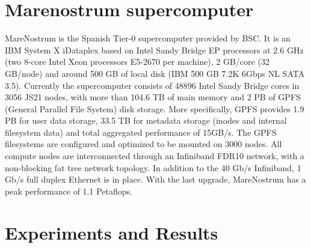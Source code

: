 \documentclass[journal]{IEEEtran}
\begin{document}
\section{Marenostrum supercomputer}
\label{sec:marenostrum}

MareNostrum is the Spanish Tier-0 supercomputer provided by BSC. It is an IBM System X iDataplex based on Intel Sandy Bridge EP processors at 2.6 GHz (two 8-core Intel Xeon processors E5-2670 per machine), 2 GB/core (32 GB/node) and around 500 GB of local disk (IBM 500 GB  7.2K 6Gbps NL SATA 3.5). Currently the supercomputer consists of 48896 Intel Sandy Bridge cores in 3056 JS21 nodes, with more than 104.6 TB of main memory and 2 PB of GPFS (General Parallel File System) disk storage. More specifically, GPFS provides 1.9 PB for user data storage,
33.5 TB for metadata storage (inodes and internal filesystem data) and total aggregated performance of 15GB/s.
The GPFS filesystems are configured and optimized to be mounted on 3000 nodes.
All compute nodes are interconnected through an Infiniband FDR10 network, with a non-blocking fat tree network topology. In addition to the 40 Gb/s Infiniband, 1 Gb/s full duplex Ethernet is in place. With the last upgrade, MareNostrum has a peak performance of 1.1 Petaflops.


\section{Experiments and Results}
\end{document}
